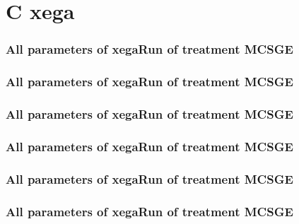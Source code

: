 \documentclass[18pt,c]{beamer}
\makeatletter
\let\beamer@writeslidentry@miniframeson=\beamer@writeslidentry
\newcommand*{\miniframeson}{\let\beamer@writeslidentry=\beamer@writeslidentry@miniframeson}
\makeatother
\begin{document}
\miniframeson
\section{C xega}

 \begin{frame}
 \fontsize{8pt}{9pt}\selectfont
 \frametitle{  All parameters of xegaRun of treatment MCSGE 
 }

 \label{ExpAtParmTable024.tex}  
 \end{frame}


 \begin{frame}
 \fontsize{8pt}{9pt}\selectfont
 \frametitle{  All parameters of xegaRun of treatment MCSGE 
 }

 \label{ExpAtParmTable025.tex}  
 \end{frame}


 \begin{frame}
 \fontsize{8pt}{9pt}\selectfont
 \frametitle{  All parameters of xegaRun of treatment MCSGE 
 }

 \label{ExpAtParmTable026.tex}  
 \end{frame}


 \begin{frame}
 \fontsize{8pt}{9pt}\selectfont
 \frametitle{  All parameters of xegaRun of treatment MCSGE 
 }

 \label{ExpAtParmTable027.tex}  
 \end{frame}


 \begin{frame}
 \fontsize{8pt}{9pt}\selectfont
 \frametitle{  All parameters of xegaRun of treatment MCSGE 
 }

 \label{ExpAtParmTable028.tex}  
 \end{frame}


 \begin{frame}
 \fontsize{8pt}{9pt}\selectfont
 \frametitle{  All parameters of xegaRun of treatment MCSGE 
 }

 \label{ExpAtParmTable029.tex}  
 \end{frame}

\end{document}
